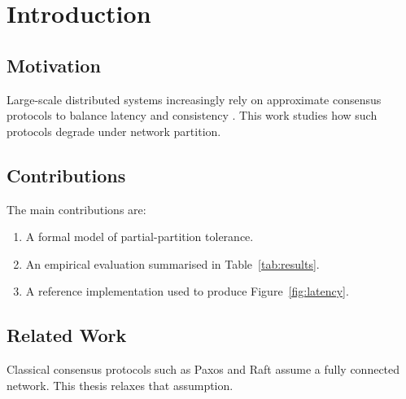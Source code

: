 \chapter{Introduction}
\label{ch:introduction}

\section{Motivation}

Large-scale distributed systems increasingly rely on approximate
consensus protocols to balance latency and consistency
\citep{lamport1998part}. This work studies how such protocols degrade
under network partition.

\section{Contributions}

The main contributions are:

\begin{enumerate}
  \item A formal model of partial-partition tolerance.
  \item An empirical evaluation summarised in Table~\ref{tab:results}.
  \item A reference implementation used to produce
    Figure~\ref{fig:latency}.
\end{enumerate}

\section{Related Work}

Classical consensus protocols such as Paxos \citep{lamport1998part} and
Raft \citep{ongaro2014search} assume a fully connected network. This
thesis relaxes that assumption.
